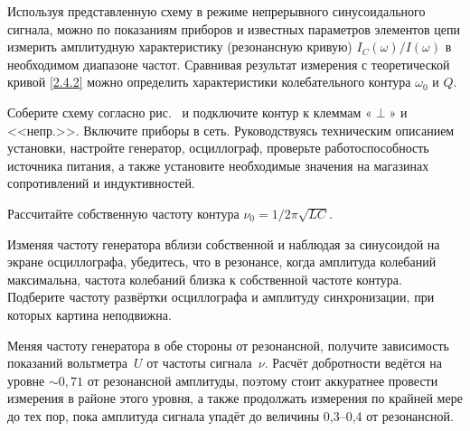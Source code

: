 Используя представленную схему в режиме непрерывного синусоидального 
сигнала, можно по показаниям приборов и известных параметров элементов 
цепи измерить амплитудную характеристику (резонансную кривую) 
$I_C(\omega)/I(\omega)$ в необходимом диапазоне частот. 
Сравнивая результат измерения с теоретической кривой \eqref{2.4.2} можно 
определить характеристики колебательного контура $\omega_0$ и $Q$.
 
\begin{lab:task}

    

	\item Соберите схему согласно рис.~
	и подключите контур к клеммам «$\perp$» и <<непр.>>. Включите приборы в сеть. 
    Руководствуясь техническим описанием установки, настройте генератор, 
    осциллограф, проверьте работоспособность источника питания, 
    а также установите необходимые значения на магазинах сопротивлений 
    и индуктивностей.


	\item Рассчитайте собственную частоту контура $\nu_{0} = 1/2\pi\sqrt{LC}$.

	\item Изменяя частоту генератора вблизи собственной и наблюдая за синусоидой 
    на экране осциллографа, убедитесь, что в резонансе, когда амплитуда колебаний 
    максимальна, частота колебаний близка к собственной частоте контура. 
    Подберите частоту развёртки осциллографа и амплитуду синхронизации, 
    при которых картина неподвижна.

	\item Меняя частоту генератора в обе стороны от резонансной, получите зависимость 
    показаний вольтметра~$U$ от частоты сигнала~$\nu$. 
    Расчёт добротности ведётся на уровне $\sim 0,71$ от резонансной амплитуды, 
    поэтому стоит аккуратнее провести измерения в районе этого уровня, 
    а также продолжать измерения по крайней мере до тех пор, пока амплитуда 
    сигнала упадёт до величины 0,3--0,4 от резонансной.


\end{lab:task}
